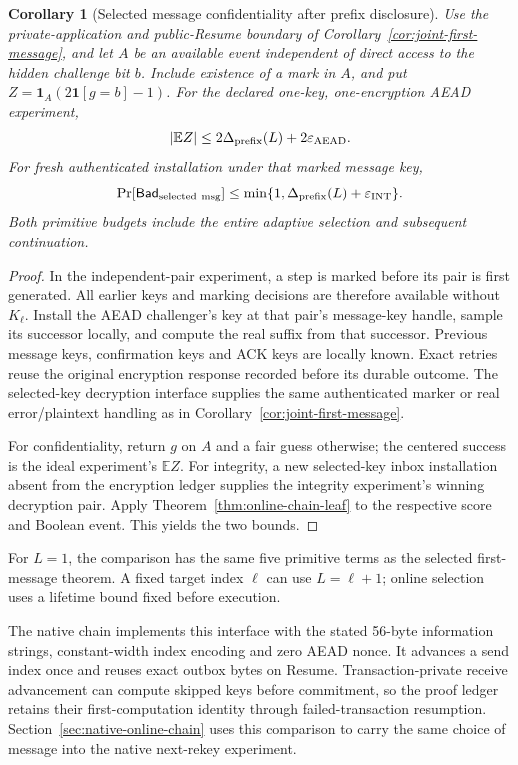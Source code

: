 \documentclass[pdflatex]{sn-jnl}
\theoremstyle{thmstyleone}
\newtheorem{corollary}[theorem]{Corollary}
\theoremstyle{thmstylethree}
\theoremstyle{thmstyletwo}
\begin{document}
\begin{corollary}[Selected message confidentiality after prefix disclosure]
\label{cor:online-chain-message}
Use the private-application and public-Resume boundary of
Corollary~\ref{cor:joint-first-message}, and let $A$ be an available
event independent of direct access to the hidden challenge bit $b$.
Include existence of a mark in $A$, and put
$Z=\mathbf1_A(2\mathbf1[g=b]-1)$. For the declared one-key,
one-encryption AEAD experiment,
\[
 |\mathbb E Z|\le
  2\Delta_{\rm prefix}(L)+2\varepsilon_{\rm AEAD}.
\]
For fresh authenticated installation under that marked message key,
\[
 \Pr[\mathsf{Bad}_{\rm selected\ msg}]
 \le\min\{1,\Delta_{\rm prefix}(L)+\varepsilon_{\rm INT}\}.
\]
Both primitive budgets include the entire adaptive selection and
subsequent continuation.
\end{corollary}
\begin{proof}
In the independent-pair experiment, a step is marked before its pair
is first generated. All earlier keys and marking decisions are
therefore available without $K_\ell$. Install the AEAD challenger's
key at that pair's message-key handle, sample its successor locally,
and compute the real suffix from that successor. Previous message
keys, confirmation keys and ACK keys are locally known. Exact retries
reuse the original encryption response recorded before its durable
outcome. The selected-key decryption interface supplies the same
authenticated marker or real error/plaintext handling as in
Corollary~\ref{cor:joint-first-message}.

For confidentiality, return $g$ on $A$ and a fair guess otherwise;
the centered success is the ideal experiment's $\mathbb E Z$.
For integrity, a new selected-key inbox installation absent from
the encryption ledger supplies the integrity experiment's winning
decryption pair. Apply Theorem~\ref{thm:online-chain-leaf} to the
respective score and Boolean event. This yields the two bounds.
\end{proof}

For $L=1$, the comparison has the same five primitive terms as
the selected first-message theorem. A fixed target index $\ell$
can use $L=\ell+1$; online selection uses a lifetime bound fixed
before execution.

The native chain implements this interface with the stated 56-byte
information strings, constant-width index encoding and zero AEAD nonce.
It advances a send index once and reuses exact outbox bytes on Resume.
Transaction-private receive advancement can compute skipped keys before
commitment, so the proof ledger retains their first-computation identity
through failed-transaction resumption.
Section~\ref{sec:native-online-chain} uses this comparison to carry the
same choice of message into the native next-rekey experiment.
\end{document}
